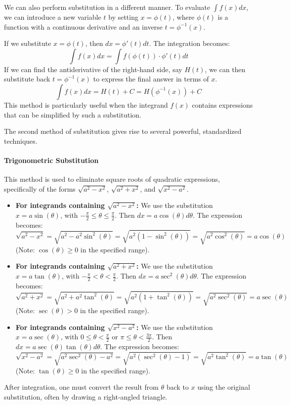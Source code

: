 \begin{definition}
We can also perform substitution in a different manner. To evaluate $\int f(x) dx$, we can introduce a new variable $t$ by setting $x = \phi(t)$, where $\phi(t)$ is a function with a continuous derivative and an inverse $t = \phi^{-1}(x)$.

If we substitute $x = \phi(t)$, then $dx = \phi'(t) dt$. The integration becomes:
\[
\int f(x) dx = \int f(\phi(t)) \cdot \phi'(t) dt
\]
If we can find the antiderivative of the right-hand side, say $H(t)$, we can then substitute back $t = \phi^{-1}(x)$ to express the final answer in terms of $x$.
\[
\int f(x) dx = H(t) + C = H(\phi^{-1}(x)) + C
\]
This method is particularly useful when the integrand $f(x)$ contains expressions that can be simplified by such a substitution.
\end{definition}

The second method of substitution gives rise to several powerful, standardized techniques.

\paragraph{Trigonometric Substitution}
This method is used to eliminate square roots of quadratic expressions, specifically of the forms $\sqrt{a^2 - x^2}$, $\sqrt{a^2 + x^2}$, and $\sqrt{x^2 - a^2}$.

\begin{itemize}
    \item \textbf{For integrands containing $\sqrt{a^2 - x^2}$:}
    We use the substitution $x = a \sin(\theta)$, with $-\frac{\pi}{2} \le \theta \le \frac{\pi}{2}$.
    Then $dx = a \cos(\theta) d\theta$.
    The expression becomes:
    \[
    \sqrt{a^2 - x^2} = \sqrt{a^2 - a^2\sin^2(\theta)} = \sqrt{a^2(1 - \sin^2(\theta))} = \sqrt{a^2\cos^2(\theta)} = a \cos(\theta)
    \]
    (Note: $\cos(\theta) \ge 0$ in the specified range).

    \item \textbf{For integrands containing $\sqrt{a^2 + x^2}$:}
    We use the substitution $x = a \tan(\theta)$, with $-\frac{\pi}{2} < \theta < \frac{\pi}{2}$.
    Then $dx = a \sec^2(\theta) d\theta$.
    The expression becomes:
    \[
    \sqrt{a^2 + x^2} = \sqrt{a^2 + a^2\tan^2(\theta)} = \sqrt{a^2(1 + \tan^2(\theta))} = \sqrt{a^2\sec^2(\theta)} = a \sec(\theta)
    \]
    (Note: $\sec(\theta) > 0$ in the specified range).

    \item \textbf{For integrands containing $\sqrt{x^2 - a^2}$:}
    We use the substitution $x = a \sec(\theta)$, with $0 \le \theta < \frac{\pi}{2}$ or $\pi \le \theta < \frac{3\pi}{2}$.
    Then $dx = a \sec(\theta)\tan(\theta) d\theta$.
    The expression becomes:
    \[
    \sqrt{x^2 - a^2} = \sqrt{a^2\sec^2(\theta) - a^2} = \sqrt{a^2(\sec^2(\theta) - 1)} = \sqrt{a^2\tan^2(\theta)} = a \tan(\theta)
    \]
    (Note: $\tan(\theta) \ge 0$ in the specified range).
\end{itemize}
After integration, one must convert the result from $\theta$ back to $x$ using the original substitution, often by drawing a right-angled triangle.

